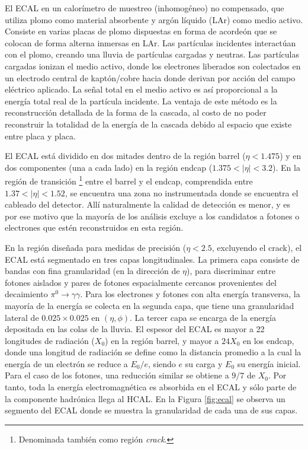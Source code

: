 El ECAL en un calorímetro de muestreo (inhomogéneo) no compensado, que utiliza plomo como material absorbente y argón líquido (LAr) como medio activo. Consiste en varias placas de plomo dispuestas en forma de acordeón que se colocan de forma alterna inmersas en LAr. Las partículas incidentes interactúan con el plomo, creando una lluvia de partículas cargadas y neutras. Las partículas cargadas ionizan el medio activo, donde los electrones liberados son colectados en un electrodo central de kaptón/cobre hacia donde derivan por acción del campo eléctrico aplicado. La señal total en el medio activo es así proporcional a la energía total real de la partícula incidente. La ventaja de este método es la reconstrucción detallada de la forma de la cascada, al costo de no poder reconstruir la totalidad de la energía de la cascada debido al espacio que existe entre placa y placa.


El ECAL está dividido en dos mitades dentro de la región barrel ($\eta < 1.475$) y en dos componentes (una a cada lado) en la región endcap ($1.375 < |\eta| < 3.2$). 
En la región de transición \footnote{Denominada también como región \textit{crack}.} entre el barrel y el endcap, comprendida entre $1.37 < |\eta| < 1.52$, se encuentra una zona no instrumentada donde se encuentra el cableado del detector. 
Allí naturalmente la calidad de detección es menor, y es por ese motivo que la mayoría de los análisis excluye a los candidatos a fotones o electrones que estén reconstruidos en esta región.

En la región diseñada para medidas de precisión ($\eta < 2.5$, excluyendo el crack),
el ECAL está segmentado en tres capas longitudinales. La primera capa consiste de
bandas con fina granularidad (en la dirección de $\eta$), para discriminar entre fotones
aislados y pares de fotones espacialmente cercanos provenientes del decaimiento
$\pi^0\to\gamma\gamma$. Para los electrones y fotones con alta energía transversa, la mayoría
de la energía se colecta en la segunda capa, que tiene una granularidad lateral de
$0.025 \times 0.025$ en $(\eta, \phi)$. La tercer capa se encarga de la energía depositada en las
colas de la lluvia.
El espesor del ECAL es mayor a 22 longitudes de radiación ($X_0$) en la región
barrel, y mayor a $24X_0$ en los endcap, donde una longitud de radiación se define
como la distancia promedio a la cual la energía de un electrón se reduce a $E_0/e$, siendo $e$ su carga y $E_0$ su energía inicial. Para el caso de los fotones, una reducción similar se obtiene a
$9/7$ de $X_0$. Por tanto, toda la energía electromagnética es absorbida en el ECAL y
sólo parte de la componente hadrónica llega al HCAL. En la Figura \ref{fig:ecal} se observa un segmento del ECAL donde se muestra la granularidad de cada una de sus capas.

